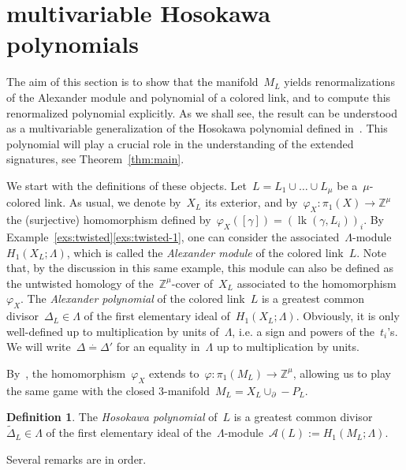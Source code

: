 \documentclass{amsart}
\newcommand{\Z}{\mathbb{Z}}
\newcommand{\A}{\mathcal{A}}
\DeclareMathOperator{\lk}{lk}
\theoremstyle{definition}
\newtheorem{definition}[thm]{Definition}
\theoremstyle{remark}
\begin{document}
	
	
	
	\section{multivariable Hosokawa polynomials}
	\label{sec:Hosokawa}
	
The aim of this section is to show that the manifold~$M_L$ yields renormalizations of the Alexander module and polynomial of a colored link, and to compute this renormalized polynomial explicitly. As we shall see, the result can be understood as a multivariable generalization of the Hosokawa polynomial defined in~\cite{Hos}.
This polynomial will play a crucial role in the understanding of the extended signatures, see Theorem~\ref{thm:main}.
	
	\medskip
	
We start with the definitions of these objects.
Let~$L=L_1\cup\dots\cup L_\mu$ be a~$\mu$-colored link. As usual, we denote by~$X_L$ its exterior, and by~$\varphi_X\colon\pi_1(X)\to\Z^\mu$ the (surjective) homomorphism defined by~$\varphi_X([\gamma])=\left(\lk(\gamma,L_i)\right)_i$. By Example~\ref{exs:twisted}\ref{exs:twisted-1}, one can consider the associated~$\Lambda$-module~$H_1(X_L;\Lambda)$, which is called the {\em Alexander module\/} of the colored link~$L$. Note that,
by the discussion in this same example, this module can also be defined as the untwisted homology of the~$\Z^\mu$-cover of~$X_L$ associated to the homomorphism~$\varphi_X$.
The {\em Alexander polynomial\/} of the  colored link~$L$ is a greatest common divisor~$\Delta_L\in\Lambda$
	of the first elementary ideal of~$H_1(X_L;\Lambda)$. Obviously, it is only well-defined up to multiplication
	by units of~$\Lambda$, i.e. a sign and powers of the~$t_i$'s. We will write~$\Delta\stackrel{\cdot}{=}\Delta'$
	for an equality in~$\Lambda$ up to multiplication by units.

By~\cite[Lemma~2.11]{CMP23}, the homomorphism~$\varphi_X$ extends to~$\varphi\colon\pi_1(M_L)\to\Z^\mu$, allowing us to play the same game with the closed $3$-manifold~$M_L=X_L\cup_\partial -P_L$.
	
	\begin{definition}
	\label{def:Hosokawa}
	The {\em Hosokawa polynomial\/} of~$L$ is a greatest common divisor~$\widetilde\Delta_L\in\Lambda$
	of the first elementary ideal of the~$\Lambda$-module~$\A(L):=H_1(M_L;\Lambda)$.
	\end{definition}
	
	Several remarks are in order.
	
\end{document}
